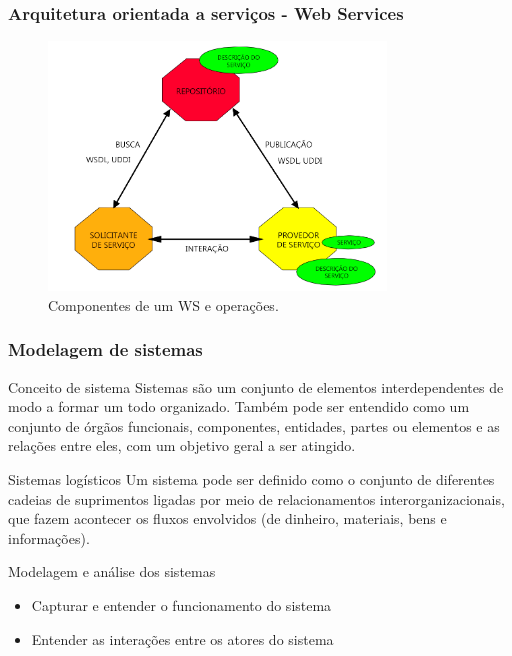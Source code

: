 \documentclass[10pt]{beamer}
\begin{document}
\begin{frame}
	\frametitle{Arquitetura orientada a serviços - Web Services} 
	
	\begin{figure}[htb]
		\centering
		\caption{Componentes de um WS e operações.}
		\label{fig:webservice-componentes}
		\includegraphics[width=0.8\textwidth]{webservice-componentes}
	\end{figure}
	
\end{frame}
\begin{frame}
	\frametitle{Modelagem de sistemas} 
	
	\begin{block}{Conceito de sistema}
		Sistemas são um conjunto de elementos interdependentes de modo a formar um todo organizado. Também pode ser entendido como um conjunto de órgãos funcionais, componentes, entidades, partes ou elementos e as relações entre eles, com um objetivo geral a ser atingido.
	\end{block}

	\begin{block}{Sistemas logísticos}
		Um sistema pode ser definido como o conjunto de diferentes cadeias de suprimentos ligadas por meio de relacionamentos interorganizacionais, que fazem acontecer os fluxos envolvidos (de dinheiro, materiais, bens e informações).
		
	\end{block}
	
	Modelagem e análise dos sistemas
	
	\begin{itemize}
		\item Capturar e entender o funcionamento do sistema
		\item Entender as interações entre os atores do sistema
	\end{itemize}
	
\end{frame}
\end{document}
